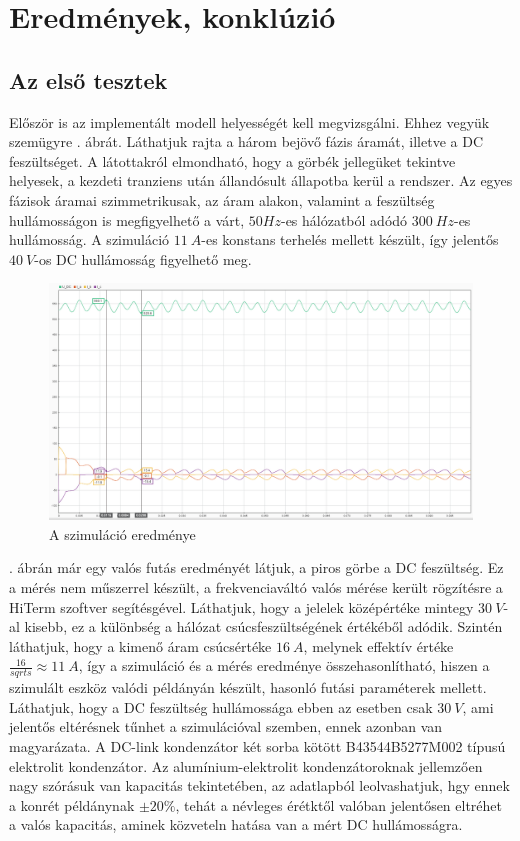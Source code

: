\chapter{Eredmények, konklúzió}

\section{Az első tesztek}

Először is az implementált modell helyességét kell megvizsgálni. Ehhez vegyük szemügyre . ábrát. Láthatjuk rajta a három bejövő fázis áramát, illetve a DC feszültséget. A látottakról elmondható, hogy a görbék jellegüket tekintve helyesek, a kezdeti tranziens után állandósult állapotba kerül a rendszer. Az egyes fázisok áramai szimmetrikusak, az áram alakon, valamint a feszültség hullámosságon is megfigyelhető a várt, $50 Hz$-es hálózatból adódó $300\ Hz$-es hullámosság. A szimuláció $11\ A$-es konstans terhelés mellett készült, így jelentős $40\ V$-os DC hullámosság figyelhető meg.

\begin{figure}[H]
	\centering
	\includegraphics[width = \textwidth]{figures/continous_testrun_1.png}
	\caption{A szimuláció eredménye} 
	\label{fig:cont_run}
\end{figure}

. ábrán már egy valós futás eredményét látjuk, a piros görbe a DC feszültség. Ez a mérés nem műszerrel készült, a frekvenciaváltó valós mérése került rögzítésre a HiTerm szoftver segítésgével. Láthatjuk, hogy a jelelek középértéke mintegy $30\ V$-al kisebb, ez a különbség a hálózat csúcsfeszültségének értékéből adódik. Szintén láthatjuk, hogy a kimenő áram csúcsértéke $16\ A$, melynek effektív értéke $\frac{16}{sqrt{s}} \approx 11\ A$, így a szimuláció és a mérés eredménye összehasonlítható, hiszen a szimulált eszköz valódi példányán készült, hasonló futási paraméterek mellett. Láthatjuk, hogy a DC feszültség hullámossága ebben az esetben csak $30\ V$, ami jelentős eltérésnek tűnhet a szimulációval szemben, ennek azonban van magyarázata. A DC-link kondenzátor két sorba kötött B43544B5277M002 típusú elektrolit kondenzátor. Az alumínium-elektrolit kondenzátoroknak jellemzően nagy szórásuk van kapacitás tekintetében, az adatlapból leolvashatjuk, hgy ennek a konrét példánynak $\pm 20\%$, tehát a névleges érétktől valóban jelentősen eltréhet a valós kapacitás, aminek közveteln hatása van a mért DC hullámosságra.

